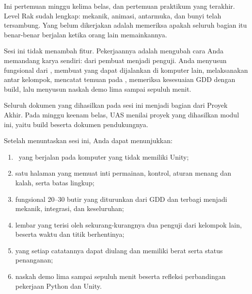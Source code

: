 

Ini pertemuan minggu kelima belas, dan pertemuan praktikum yang terakhir.
Level Rak sudah lengkap: mekanik, animasi, antarmuka, dan bunyi telah
tersambung. Yang belum dikerjakan adalah memeriksa apakah seluruh bagian itu
benar-benar berjalan ketika orang lain memainkannya.

Sesi ini tidak menambah fitur. Pekerjaannya adalah mengubah cara Anda memandang
karya sendiri: dari pembuat menjadi penguji. Anda menyusun
 fungsional dari , membuat  yang
dapat dijalankan di komputer lain, melaksanakan  antar
kelompok, mencatat temuan pada , memeriksa kesesuaian GDD
dengan build, lalu menyusun naskah demo lima sampai sepuluh menit.

Seluruh dokumen yang dihasilkan pada sesi ini menjadi bagian dari Proyek Akhir.
Pada minggu keenam belas, UAS menilai proyek yang dihasilkan modul ini, yaitu
build beserta dokumen pendukungnya.


\begin{tujuanbox}
Setelah menuntaskan sesi ini, Anda dapat menunjukkan:
\begin{enumerate}[leftmargin=1.5em, itemsep=0.2em]
  \item {} \NamaPermainan\ yang berjalan pada komputer yang tidak
        memiliki Unity;
  \item {} satu halaman yang memuat inti permainan, kontrol, aturan
        menang dan kalah, serta batas lingkup;
  \item {} fungsional 20--30 butir yang diturunkan dari GDD
        dan terbagi menjadi mekanik, integrasi, dan keseluruhan;
  \item lembar  yang terisi oleh sekurang-kurangnya dua
        penguji dari kelompok lain, beserta waktu dan titik berhentinya;
  \item {} yang setiap catatannya dapat diulang dan memiliki
        berat serta status penanganan;
  \item naskah demo lima sampai sepuluh menit beserta refleksi perbandingan
        pekerjaan Python dan Unity.
\end{enumerate}
\end{tujuanbox}

